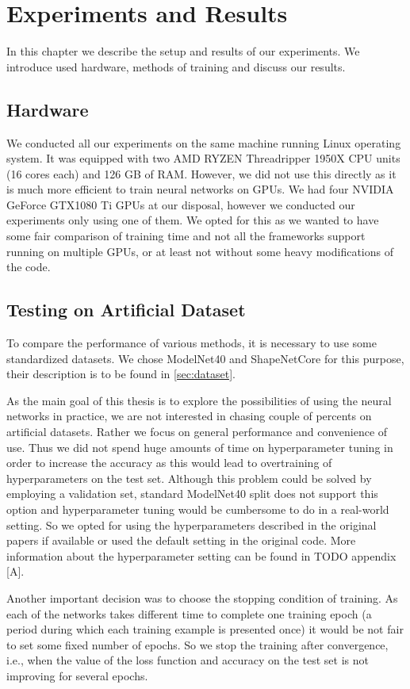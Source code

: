 \chapter{Experiments and Results}
\label{sec:chap5}
In this chapter we describe the setup and results of our experiments. We introduce used hardware, methods of training and discuss our results.

\section{Hardware}
We conducted all our experiments on the same machine running Linux operating system. It was equipped with two AMD RYZEN Threadripper 1950X CPU units (16 cores each) and 126 GB of RAM. However, we did not use this directly as it is much more efficient to train neural networks on GPUs. We had four NVIDIA GeForce GTX1080 Ti GPUs at our disposal, however we conducted our experiments only using one of them. We opted for this as we wanted to have some fair comparison of training time and not all the frameworks support running on multiple GPUs, or at least not without some heavy modifications of the code. 

\section{Testing on Artificial Dataset}
To compare the performance of various methods, it is necessary to use some standardized datasets. We chose ModelNet40 and ShapeNetCore for this purpose, their description is to be found in \autoref{sec:dataset}. \par
As the main goal of this thesis is to explore the possibilities of using the neural networks in practice, we are not interested in chasing couple of percents on artificial datasets. Rather we focus on general performance and convenience of use. Thus we did not spend huge amounts of time on hyperparameter tuning in order to increase the accuracy as this would lead to overtraining of hyperparameters on the test set. Although this problem could be solved by employing a validation set, standard ModelNet40 split does not support this option and hyperparameter tuning would be cumbersome to do in a real-world setting. So we opted for using the hyperparameters described in the original papers if available or used the default setting in the original code. More information about the hyperparameter setting can be found in TODO appendix [A]. \par
Another important decision was to choose the stopping condition of training. As each of the networks takes different time to complete one training epoch (a period during which each training example is presented once) it would be not fair to set some fixed number of epochs. So we stop the training after convergence, i.e., when the value of the loss function and accuracy on the test set is not improving for several epochs. 

